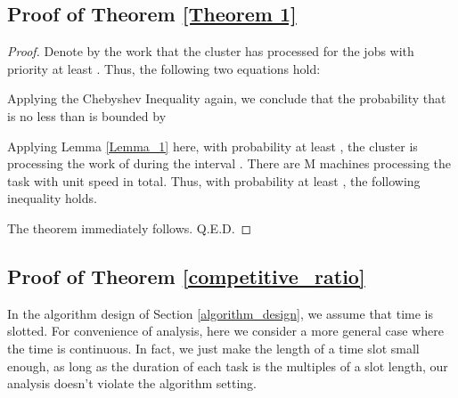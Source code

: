 \documentclass[10pt,conference,compsocconf,letterpaper]{IEEEtran}
\begin{document}
\subsection{Proof of Theorem \ref{Theorem 1}}
\label{proof_theorem_1}
\begin{proof}
Denote by  the work that the cluster has processed for the jobs with priority at least . Thus, the following two equations hold:



Applying the Chebyshev Inequality again, we conclude that the probability that  is no less than  is bounded by



Applying Lemma \ref{Lemma_1} here, with probability at least , the cluster is processing the work of  during the interval .
There are M machines processing the task with unit speed in total. Thus, with probability at least , the following inequality holds.


The theorem immediately follows. Q.E.D.
\end{proof}


\subsection{Proof of Theorem \ref{competitive_ratio}}
\label{proof_a}
In the algorithm design of Section \ref{algorithm_design}, we assume that time is slotted. For convenience of analysis, here we
consider a more general case where the time is continuous. In fact, we just make the length of
a time slot small enough, as long as the duration of each task is the multiples of
a slot length, our analysis doesn't violate the algorithm setting.
\end{document}
